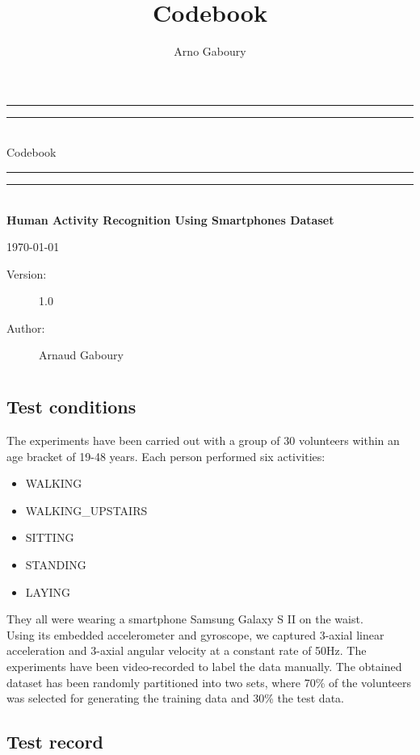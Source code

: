 \documentclass[fontsize=12pts,BCOR=8.25mm]{scrartcl} %
\title {Codebook}
\author{Arno Gaboury}
\date{}
\newcommand*{\titleGP}{\begingroup %
\centering %
\vspace*{\baselineskip} %
{\begingroup
\color{mydarkgreen}
\rule{\textwidth}{1.6pt}\vspace*{-\baselineskip}\vspace*{2pt} %
\rule{\textwidth}{0.4pt}\\[\baselineskip] %

{\Huge Codebook}\\[0.2\baselineskip] %

\rule{\textwidth}{0.4pt}\vspace*{-\baselineskip}\vspace{3.2pt} %
\rule{\textwidth}{1.6pt}\\[\baselineskip] %

 {\large \bfseries Human Activity Recognition Using Smartphones Dataset}
\vspace*{2\baselineskip} 

\today
\endgroup}

\vfill %

{\large
\begin{description}
\item [Version:] 1.0
\item [Author:]Arnaud Gaboury 
\end{description}}

\endgroup}
\begin{document}
\titleGP
\clearpage

\tableofcontents
\clearpage

\section{\texorpdfstring{\color{mydarkgreen}{General Information}}{}}

\subsection{Test conditions}


The experiments have been carried out with a group of 30 volunteers within an
age bracket of 19-48 years. Each person performed six activities: 

\begin{itemize}
\item WALKING
\item WALKING\_UPSTAIRS
\item SITTING
\item STANDING
\item LAYING
\end{itemize}
They all were wearing a smartphone Samsung Galaxy S II on the waist.\\



Using its embedded accelerometer and gyroscope, we captured 3-axial 
linear acceleration and 3-axial angular velocity at a constant rate of 50Hz. 
The experiments have been video-recorded to label the data manually. The 
obtained dataset has been randomly partitioned into two sets, where 70\% 
of the volunteers was selected for generating the training data and 30\%
the test data. \\


\subsection{Test record}


\section{\texorpdfstring{\color{mydarkgreen}{Coding guidelines}}{}}
\section{\texorpdfstring{\color{mydarkgreen}{Major Topic Codes}}{}}
\end{document}
